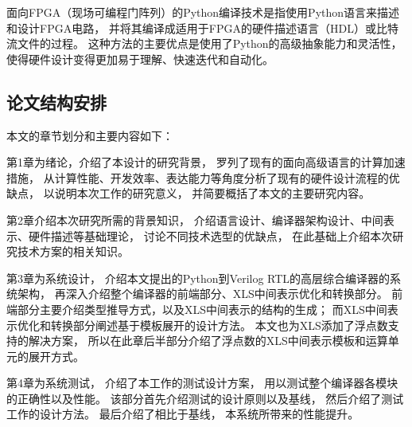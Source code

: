 面向FPGA（现场可编程门阵列）的Python编译技术是指使用Python语言来描述和设计FPGA电路，
并将其编译成适用于FPGA的硬件描述语言（HDL）或比特流文件的过程。
这种方法的主要优点是使用了Python的高级抽象能力和灵活性，
使得硬件设计变得更加易于理解、快速迭代和自动化。

\subsection{论文结构安排}

本文的章节划分和主要内容如下：

第1章为绪论，介绍了本设计的研究背景，
罗列了现有的面向高级语言的计算加速措施，
从计算性能、开发效率、表达能力等角度分析了现有的硬件设计流程的优缺点，
以说明本次工作的研究意义，
并简要概括了本文的主要研究内容。

第2章介绍本次研究所需的背景知识，
介绍语言设计、编译器架构设计、中间表示、硬件描述等基础理论，
讨论不同技术选型的优缺点，
在此基础上介绍本次研究技术方案的相关知识。

第3章为系统设计，
介绍本文提出的Python到Verilog RTL的高层综合编译器的系统架构，
再深入介绍整个编译器的前端部分、XLS中间表示优化和转换部分。
前端部分主要介绍类型推导方式，以及XLS中间表示的结构的生成；
而XLS中间表示优化和转换部分阐述基于模板展开的设计方法。
本文也为XLS添加了浮点数支持的解决方案，
所以在此章后半部分介绍了浮点数的XLS中间表示模板和运算单元的展开方式。

第4章为系统测试，
介绍了本工作的测试设计方案，
用以测试整个编译器各模块的正确性以及性能。
该部分首先介绍测试的设计原则以及基线，
然后介绍了测试工作的设计方法。
最后介绍了相比于基线，
本系统所带来的性能提升。